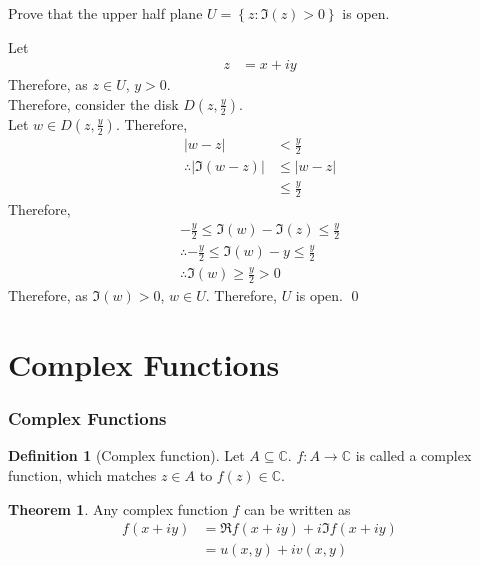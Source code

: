 \documentclass[fleqn, a4paper, 12pt, twoside]{article}
\theoremstyle{definition}
\newtheorem{definition}{Definition}
\theoremstyle{theorem}
\newtheorem{theorem}{Theorem}
\begin{document}
\begin{question}
	Prove that the upper half plane $U = \left\{ z : \Im(z) > 0 \right\}$ is open.
\end{question}

\begin{solution}
	Let
	\begin{align*}
		z & = x + i y
	\end{align*}
	Therefore, as $z \in U$, $y > 0$.\\
	Therefore, consider the disk $D\left( z , \frac{y}{2} \right)$.\\
	Let $w \in D\left( z , \frac{y}{2} \right)$.
	Therefore,
	\begin{align*}
		|w - z|                              & < \frac{y}{2} \\
		\therefore \left| \Im(w - z) \right| & \le |w - z|   \\
                                                     & \le \frac{y}{2}
	\end{align*}
	Therefore,
	\begin{gather*}
		-\frac{y}{2} \le \Im(w) - \Im(z) \le \frac{y}{2}\\
		\therefore -\frac{y}{2} \le \Im(w) - y \le \frac{y}{2}\\
		\therefore \Im(w) \ge \frac{y}{2} > 0
	\end{gather*}
	Therefore, as $\Im(w) > 0$, $w \in U$.
	Therefore, $U$ is open.
	\qed
\end{solution}

\newpage
\part{Complex Functions}

\section{Complex Functions}

\begin{definition}[Complex function]
	Let $A \subseteq \mathbb{C}$.
	$f : A \to \mathbb{C}$ is called a complex function, which matches $z \in A$ to $f(z) \in \mathbb{C}$.
\end{definition}

\begin{theorem}
	Any complex function $f$ can be written as
	\begin{align*}
		f(x + i y) & = \Re f(x + i y) + i \Im f(x + i y) \\
                           & = u(x,y) + i v(x,y)
	\end{align*}
\end{theorem}
\end{document}

